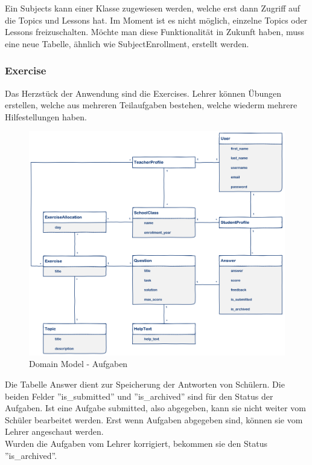 Ein Subjects kann einer Klasse zugewiesen werden, welche erst dann Zugriff auf die Topics und Lessons hat. Im Moment ist es nicht möglich, einzelne Topics oder Lessons freizuschalten. Möchte man diese Funktionalität in Zukunft haben, muss eine neue Tabelle, ähnlich wie SubjectEnrollment, erstellt werden.

\subsubsection*{Exercise}
Das Herzstück der Anwendung sind die Exercises. Lehrer können Übungen erstellen, welche aus mehreren Teilaufgaben bestehen, welche wiederm mehrere Hilfestellungen haben. 

\begin{figure}[H]
\begin{center}
	\includegraphics[width=\textwidth, keepaspectratio]{images/domain_model_exercise.png}
	\caption{Domain Model - Aufgaben}
	\label{fig:domain_model_exercise}
\end{center}
\end{figure}

Die Tabelle Answer dient zur Speicherung der Antworten von Schülern. Die beiden Felder ''is\_submitted'' und ''is\_archived'' sind für den Status der Aufgaben. Ist eine Aufgabe submitted, also abgegeben, kann sie nicht weiter vom Schüler bearbeitet werden. Erst wenn Aufgaben abgegeben sind, können sie vom Lehrer angeschaut werden. \\ 
Wurden die Aufgaben vom Lehrer korrigiert, bekommen sie den Status ''is\_archived''.

